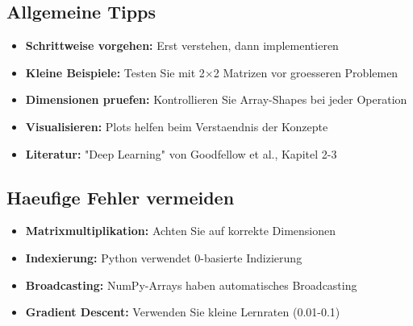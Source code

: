 ﻿\documentclass[12pt,a4paper]{article}
\begin{document}
\subsection*{Allgemeine Tipps}
\begin{itemize}
    \item \textbf{Schrittweise vorgehen:} Erst verstehen, dann implementieren
    \item \textbf{Kleine Beispiele:} Testen Sie mit 2×2 Matrizen vor groesseren Problemen
    \item \textbf{Dimensionen pruefen:} Kontrollieren Sie Array-Shapes bei jeder Operation
    \item \textbf{Visualisieren:} Plots helfen beim Verstaendnis der Konzepte
    \item \textbf{Literatur:} "Deep Learning" von Goodfellow et al., Kapitel 2-3
\end{itemize}

\subsection*{Haeufige Fehler vermeiden}
\begin{itemize}
    \item \textbf{Matrixmultiplikation:} Achten Sie auf korrekte Dimensionen
    \item \textbf{Indexierung:} Python verwendet 0-basierte Indizierung
    \item \textbf{Broadcasting:} NumPy-Arrays haben automatisches Broadcasting
    \item \textbf{Gradient Descent:} Verwenden Sie kleine Lernraten (0.01-0.1)
\end{itemize}
\end{document}
